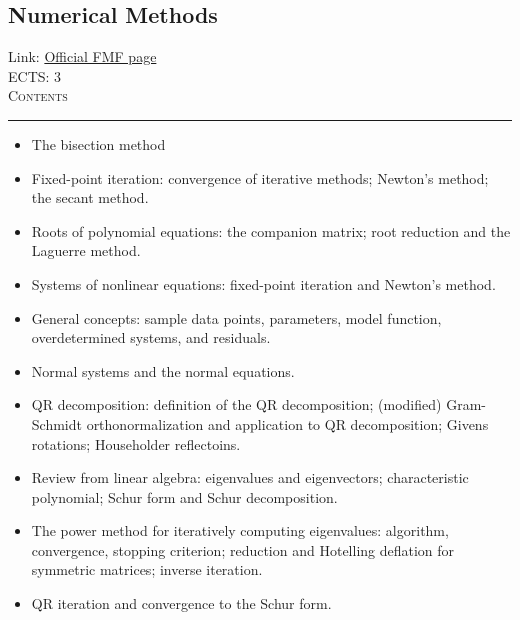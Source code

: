 \documentclass[11pt, a4paper]{article}
\newenvironment{course}[3]{
\subsection{#1}%
Link: \href{#2}{Official FMF page}\\%
ECTS: #3%
\vspace{1ex}
\\
{\large \textsc{Contents}}\\[-0.9ex]%
\rule{\textwidth}{0.5pt}
\vspace{-3ex}
}
{}
\newenvironment{chapter}[1]{
\begin{tcolorbox}[title=#1, breakable]
}
{\end{tcolorbox}}
\begin{document}
\begin{course}{Numerical Methods}{https://www.fmf.uni-lj.si/en/study-physics/programmes/1fiz/2020/7000777/courses/524/}{3}
\begin{chapter}{Nonlinear equations}
\begin{itemize}
            \item The bisection method

            \item Fixed-point iteration: convergence of iterative methods; Newton's method; the secant method.

            \item Roots of polynomial equations: the companion matrix; root reduction and the Laguerre method.

            \item Systems of nonlinear equations: fixed-point iteration and Newton's method.
        
        \end{itemize}
    \end{chapter}

    \begin{chapter}{Linear least square problems}
        \begin{itemize}
        
            \item General concepts: sample data points, parameters, model function, overdetermined systems, and residuals.

            \item Normal systems and the normal equations.

            \item QR decomposition: definition of the QR decomposition; (modified) Gram-Schmidt orthonormalization and application to QR decomposition; Givens rotations; Householder reflectoins.
        
        \end{itemize}
    \end{chapter}

    \begin{chapter}{The eigenvalue problem}
        \begin{itemize}
        
            \item Review from linear algebra: eigenvalues and eigenvectors; characteristic polynomial; Schur form and Schur decomposition.

            \item The power method for iteratively computing eigenvalues: algorithm, convergence, stopping criterion; reduction and Hotelling deflation for symmetric matrices; inverse iteration.

            \item QR iteration and convergence to the Schur form.


\end{itemize}
\end{chapter}
\end{course}
\end{document}
